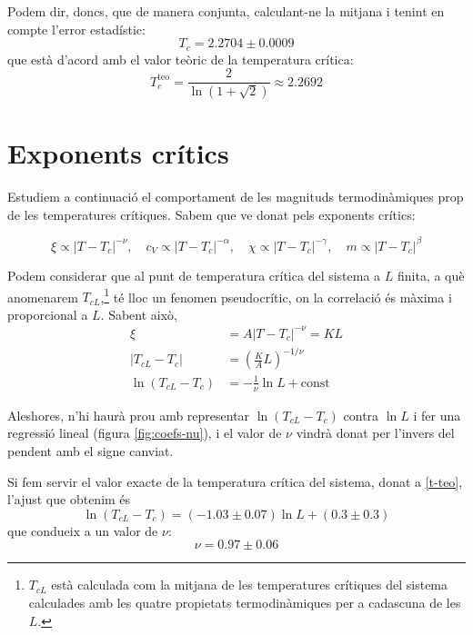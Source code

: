 \documentclass[a4paper]{article}
\begin{document}
Podem dir, doncs, que de manera conjunta, calculant-ne la mitjana i tenint en compte l'error estadístic:
\begin{equation} \label{t-mean}
    T_c = 2.2704 \pm 0.0009
\end{equation}
que està d'acord amb el valor teòric de la temperatura crítica:
\begin{equation} \label{t-teo}
    T_c^\text{teo} = \frac{2}{\ln(1+\sqrt{2})} \approx 2.2692
\end{equation}

\section{Exponents crítics}

Estudiem a continuació el comportament de les magnituds termodinàmiques prop de les temperatures crítiques. Sabem que ve donat pels exponents crítics:

\begin{equation*}
    \xi \propto \left| T-T_c \right|^{-\nu},\quad
    c_V \propto \left| T-T_c \right|^{-\alpha},\quad
    \chi \propto \left| T-T_c \right|^{-\gamma},\quad
    m \propto \left| T-T_c \right|^{\beta}
\end{equation*}

Podem considerar que al punt de temperatura crítica del sistema a $L$ finita, a què anomenarem $T_{cL}$,\footnote{$T_{cL}$ està calculada com la mitjana de les temperatures crítiques del sistema calculades amb les quatre propietats termodinàmiques per a cadascuna de les $L$.} té lloc un fenomen pseudocrític, on la correlació és màxima i proporcional a $L$. Sabent això,
\begin{align*}
    \xi &= A \left| T-T_c \right|^{-\nu} = KL \\
    \left|T_{cL}-T_c \right| &= \left(\frac{K}{A} L \right)^{-1/\nu} \\
    \ln \left(T_{cL} - T_c \right) &= -\frac{1}{\nu} \ln L + \text{const}
\end{align*}

Aleshores, n'hi haurà prou amb representar $\ln(T_{cL}-T_c)$ contra $\ln L$ i fer una regressió lineal (figura \ref{fig:coefs-nu}), i el valor de $\nu$ vindrà donat per l'invers del pendent amb el signe canviat.

Si fem servir el valor exacte de la temperatura crítica del sistema, donat a \eqref{t-teo}, l'ajust que obtenim és
\begin{equation*}
    \ln \left(T_{cL} - T_c\right) = (-1.03 \pm 0.07) \ln L + (0.3 \pm 0.3)
\end{equation*}
que condueix a un valor de $\nu$:
\begin{equation*}
	\nu = 0.97 \pm 0.06
\end{equation*}
\end{document}
